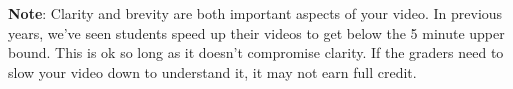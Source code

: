 \documentclass[12pt, oneside]{article}
\begin{document}
{\bf Note}: Clarity and brevity are both important aspects of your video.  In previous years, we've seen 
students speed up their videos to get below the 5 minute upper bound. This is ok so long as it doesn't 
compromise clarity. If the graders need to slow your video down to understand
it, it may not earn full credit.



\newpage
\end{document}

